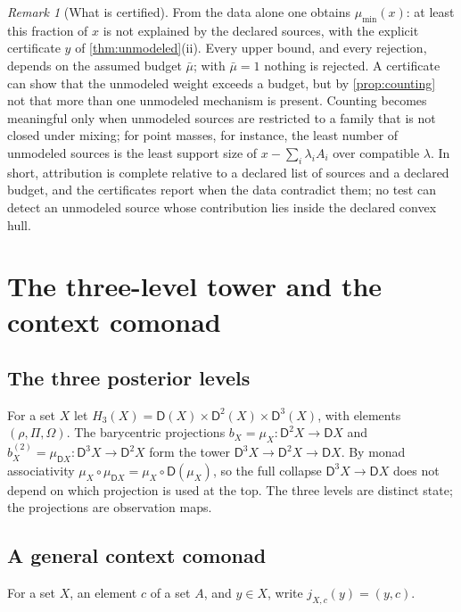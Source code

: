 \documentclass[11pt]{article}
\theoremstyle{definition}
\theoremstyle{remark}
\newtheorem{remark}[theorem]{Remark}
\newcommand{\D}{\mathsf{D}}
\begin{document}
\begin{remark}[What is certified]
From the data alone one obtains $\mu_{\min}(x)$: at least this fraction of $x$ is not explained by the
declared sources, with the explicit certificate $y$ of \cref{thm:unmodeled}(ii). Every upper bound, and
every rejection, depends on the assumed budget $\bar\mu$; with $\bar\mu=1$ nothing is rejected. A
certificate can show that the unmodeled weight exceeds a budget, but by \cref{prop:counting} not that
more than one unmodeled mechanism is present. Counting becomes meaningful only when unmodeled
sources are restricted to a family that is not closed under mixing; for point masses, for instance,
the least number of unmodeled sources is the least support size of $x-\sum_i\lambda_iA_i$ over
compatible $\lambda$. In short, attribution is complete relative to a declared list of sources and a
declared budget, and the certificates report when the data contradict them; no test can detect an
unmodeled source whose contribution lies inside the declared convex hull.
\end{remark}

\section{The three-level tower and the context comonad}

\subsection{The three posterior levels}

For a set $X$ let $H_3(X)=\D(X)\times\D^2(X)\times\D^3(X)$, with elements $(\rho,\Pi,\Omega)$. The
barycentric projections $b_X=\mu_X\colon\D^2X\to\D X$ and $b^{(2)}_X=\mu_{\D X}\colon\D^3X\to\D^2X$
form the tower $\D^3X\to\D^2X\to\D X$. By monad associativity
$\mu_X\circ\mu_{\D X}=\mu_X\circ\D(\mu_X)$, so the full collapse $\D^3X\to\D X$ does not depend on
which projection is used at the top. The three levels are distinct state; the projections are
observation maps.

\subsection{A general context comonad}

For a set $X$, an element $c$ of a set $A$, and $y\in X$, write $j_{X,c}(y)=(y,c)$.
\end{document}
